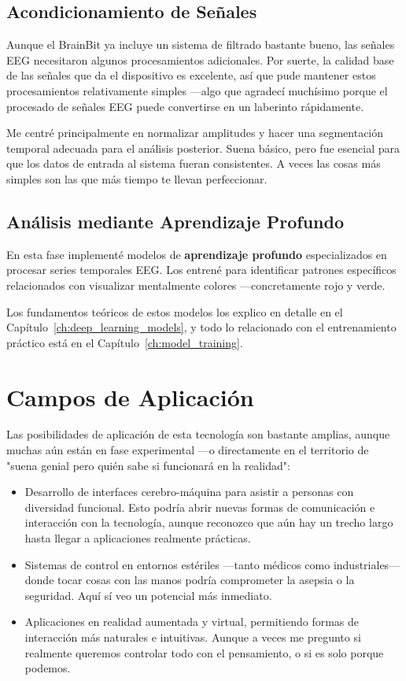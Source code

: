     \subsection{Acondicionamiento de Señales}
    Aunque el BrainBit ya incluye un sistema de filtrado bastante bueno, las señales EEG necesitaron algunos procesamientos adicionales. Por suerte, la calidad base de las señales que da el dispositivo es excelente, así que pude mantener estos procesamientos relativamente simples —algo que agradecí muchísimo porque el procesado de señales EEG puede convertirse en un laberinto rápidamente.
    
    Me centré principalmente en normalizar amplitudes y hacer una segmentación temporal adecuada para el análisis posterior. Suena básico, pero fue esencial para que los datos de entrada al sistema fueran consistentes. A veces las cosas más simples son las que más tiempo te llevan perfeccionar.

    \subsection{Análisis mediante Aprendizaje Profundo}
    En esta fase implementé modelos de \textbf{aprendizaje profundo} especializados en procesar series temporales EEG. Los entrené para identificar patrones específicos relacionados con visualizar mentalmente colores —concretamente rojo y verde.
    
    Los fundamentos teóricos de estos modelos los explico en detalle en el Capítulo~\ref{ch:deep_learning_models}, y todo lo relacionado con el entrenamiento práctico está en el Capítulo~\ref{ch:model_training}.

\section{Campos de Aplicación}
Las posibilidades de aplicación de esta tecnología son bastante amplias, aunque muchas aún están en fase experimental —o directamente en el territorio de "suena genial pero quién sabe si funcionará en la realidad":

    \begin{itemize}
        \item Desarrollo de interfaces cerebro-máquina para asistir a personas con diversidad funcional. Esto podría abrir nuevas formas de comunicación e interacción con la tecnología, aunque reconozco que aún hay un trecho largo hasta llegar a aplicaciones realmente prácticas.
        \item Sistemas de control en entornos estériles —tanto médicos como industriales— donde tocar cosas con las manos podría comprometer la asepsia o la seguridad. Aquí sí veo un potencial más inmediato.
        \item Aplicaciones en realidad aumentada y virtual, permitiendo formas de interacción más naturales e intuitivas. Aunque a veces me pregunto si realmente queremos controlar todo con el pensamiento, o si es solo porque podemos.
    \end{itemize}


